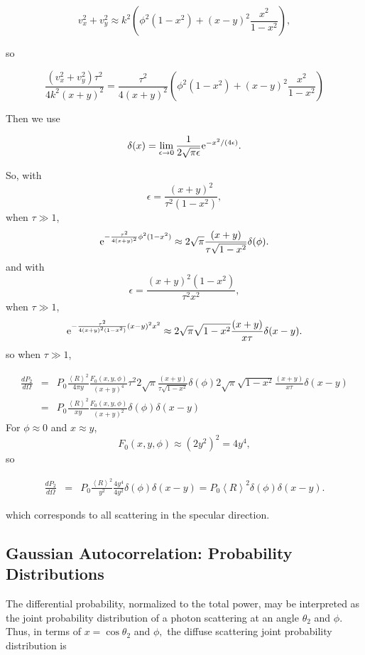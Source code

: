 \documentclass[11pt]{article}
\newcommand{\der}[2]{\frac{d {#1}}{d {#2}}}
\newcommand{\e}{{\rm e}}
\begin{document}
{{{{$$v_{x}^{2}+v_{y}^{2}\approx k^{2}\left(\phi^{2}(1-x^{2})+(x-y)^{2}\frac{x^{2}}{1-x^{2}}\right),$$

so

$$\frac{(v_{x}^{2}+v_{y}^{2})\tau^{2}}{4k^{2}(x+y)^{2}}=\frac{\tau^{2}}{4(x+y)^{2}}\left(\phi^{2}(1-x^{2})+(x-y)^{2}\frac{x^{2}}{1-x^{2}}\right)$$

Then we use

$$\delta(x)=\lim_{\epsilon\rightarrow 0}\frac{1}{2\sqrt{\pi\epsilon}}\e^{-x^{2}/(4\epsilon)}.$$

So, with $$\epsilon=\frac{(x+y)^{2}}{\tau^{2}(1-x^{2})},$$
when $\tau\gg 1$, 
$$\e^{-\frac{\tau^{2}}{4(x+y)^{2}}\phi^{2}(1-x^{2})}\approx 2\sqrt{\pi}\frac{(x+y)}{\tau\sqrt{1-x^{2}}}\delta(\phi).$$
and
 with $$\epsilon=\frac{(x+y)^{2}(1-x^{2})}{\tau^{2}x^{2}},$$
when $\tau\gg 1$, 
$$\e^{-\frac{\tau^{2}}{4(x+y)^{2}(1-x^{2})}(x-y)^{2}x^{2}}\approx 2\sqrt{\pi}\sqrt{1-x^{2}}\frac{(x+y)}{x\tau}\delta(x-y).$$
so when $\tau\gg 1$, 

\begin{eqnarray}
\der{P_{2}}{\Omega}&=&P_{0}\frac{\left<R\right>^{2}}{4\pi y}\frac{F_{0}(x,y,\phi)}{(x+y)^{4}}\tau^{2}2\sqrt{\pi}\frac{(x+y)}{\tau\sqrt{1-x^{2}}}\delta(\phi)2\sqrt{\pi}\sqrt{1-x^{2}}\frac{(x+y)}{x\tau}\delta(x-y)\\
&=&P_{0}\frac{\left<R\right>^{2}}{xy}\frac{F_{0}(x,y,\phi)}{(x+y)^{2}}\delta(\phi)\delta(x-y)
\end{eqnarray}
For $\phi\approx 0$ and $x\approx y$, 
$$F_{0}(x,y,\phi)\approx\left(2y^{2}\right)^{2}=4y^{4},$$
so

\begin{eqnarray}
\der{P_{2}}{\Omega}
&=&P_{0}\frac{\left<R\right>^{2}}{y^{2}}\frac{4y^{4}}{4y^{2}}\delta(\phi)\delta(x-y)=P_{0}\left<R\right>^{2}\delta(\phi)\delta(x-y).
\end{eqnarray}

which corresponds to all scattering in the specular direction.


\subsection{Gaussian Autocorrelation: Probability Distributions}

The differential probability, normalized to the total power, may be interpreted as the joint probability distribution of a photon scattering at an angle $\theta_{2}$ and $\phi$.  Thus, in terms of $x=\cos\theta_{2}$ and $\phi,$ the diffuse scattering joint probability distribution is

}}}}
\end{document}
